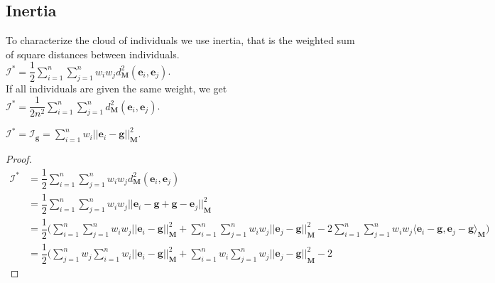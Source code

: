 \begin{notechapter}
\subsection{Inertia}
To characterize the cloud of individuals we use inertia, that is the weighted sum of square distances between individuals.\\[5pt]
$\mathcal{I}^{*} = \dfrac{1}{2} 
\displaystyle\sum\limits_{i=1}^{n}\displaystyle\sum\limits_{j=1}^{n}{w_i}{w_j}d_{\textbf{M}}^2(\mathbf{e}_{i}, \mathbf{e}_{j})$.\\[5pt]
If all individuals are given the same weight, we get
$\mathcal{I}^{*} = \dfrac{1}{2n^2}
\displaystyle\sum\limits_{i=1}^{n}\displaystyle\sum\limits_{j=1}^{n}d_{\textbf{M}}^2(\mathbf{e}_{i}, \mathbf{e}_{j})$.\\[5pt]
\begin{prop}
$\mathcal{I}^{*} = \mathcal{I}_{\mathbf{g}} = 
\displaystyle\sum\limits_{i=1}^{n} {w_i} \big| \big| \mathbf{e}_{i} - \mathbf{g} \big| \big|_{\textbf{M}}^{2}$.
\end{prop}
\begin{proof}
\begin{align*}
    \mathcal{I}^{*} &= \dfrac{1}{2} 
    \displaystyle\sum\limits_{i=1}^{n}\displaystyle\sum\limits_{j=1}^{n}{w_i}{w_j}d_{\textbf{M}}^2(\mathbf{e}_{i}, \mathbf{e}_{j})\\
    &= \dfrac{1}{2} 
    \displaystyle\sum\limits_{i=1}^{n}\displaystyle\sum\limits_{j=1}^{n}{w_i}{w_j}
     \big| \big| {\textbf{e}_i - \textbf{g} + \textbf{g} - \textbf{e}_j\big| \big|}_{\mathbf{M}}^2\\
        &= \dfrac{1}{2} \bigg(
        \displaystyle\sum\limits_{i=1}^{n}\displaystyle\sum\limits_{j=1}^{n}{w_i}{w_j}
         \big| \big| {\textbf{e}_i - \textbf{g} \big| \big|}_{\mathbf{M}}^2 + 
        \displaystyle\sum\limits_{i=1}^{n}\displaystyle\sum\limits_{j=1}^{n}{w_i}{w_j}
         \big| \big| {\textbf{e}_j - \textbf{g} \big| \big|}_{\mathbf{M}}^2 - 2
        \displaystyle\sum\limits_{i=1}^{n}\displaystyle\sum\limits_{j=1}^{n}{w_i}{w_j}
         \langle \textbf{e}_i - \textbf{g}, \textbf{e}_j - \textbf{g} \rangle_{\textbf{M}} \bigg)\\
        &= \dfrac{1}{2} \bigg(
        \displaystyle\sum\limits_{j=1}^{n} {w_j} \displaystyle\sum\limits_{i=1}^{n}{w_i}
         \big| \big| {\textbf{e}_i - \textbf{g} \big| \big|}_{\mathbf{M}}^2 + 
        \displaystyle\sum\limits_{i=1}^{n} {w_i} \displaystyle\sum\limits_{j=1}^{n}{w_j}
         \big| \big| {\textbf{e}_j - \textbf{g} \big| \big|}_{\mathbf{M}}^2 - 2

\end{align*}
\end{proof}
\end{notechapter}
